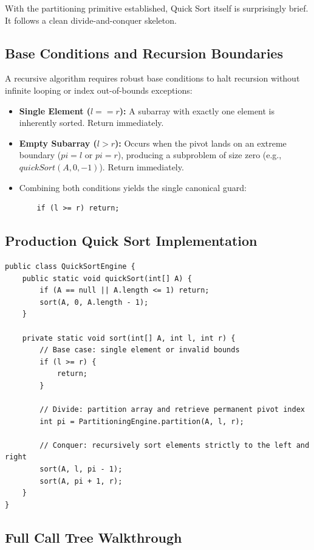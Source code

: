 \documentclass[10pt,journal,compsoc,onecolumn]{IEEEtran}
\begin{document}
With the partitioning primitive established, Quick Sort itself is surprisingly brief. It follows a clean divide-and-conquer skeleton.

\subsection{Base Conditions and Recursion Boundaries}

A recursive algorithm requires robust base conditions to halt recursion without infinite looping or index out-of-bounds exceptions:
\begin{itemize}
    \item \textbf{Single Element ($l == r$):} A subarray with exactly one element is inherently sorted. Return immediately.
    \item \textbf{Empty Subarray ($l > r$):} Occurs when the pivot lands on an extreme boundary ($pi = l$ or $pi = r$), producing a subproblem of size zero (e.g., $quickSort(A, 0, -1)$). Return immediately.
    \item Combining both conditions yields the single canonical guard:
    \begin{verbatim}
    if (l >= r) return;
    \end{verbatim}
\end{itemize}

\subsection{Production Quick Sort Implementation}

\begin{verbatim}
public class QuickSortEngine {
    public static void quickSort(int[] A) {
        if (A == null || A.length <= 1) return;
        sort(A, 0, A.length - 1);
    }

    private static void sort(int[] A, int l, int r) {
        // Base case: single element or invalid bounds
        if (l >= r) {
            return;
        }

        // Divide: partition array and retrieve permanent pivot index
        int pi = PartitioningEngine.partition(A, l, r);

        // Conquer: recursively sort elements strictly to the left and right
        sort(A, l, pi - 1);
        sort(A, pi + 1, r);
    }
}
\end{verbatim}

\subsection{Full Call Tree Walkthrough}
\end{document}
